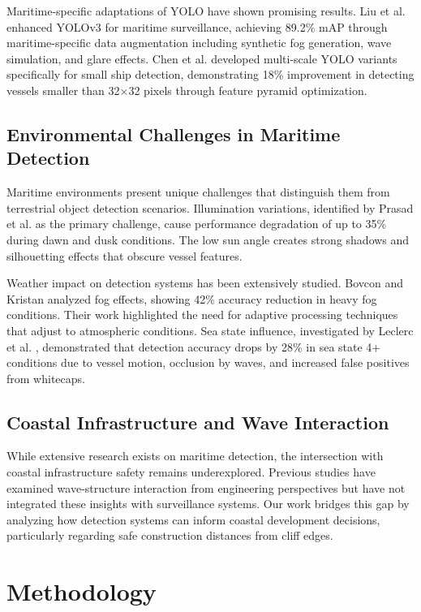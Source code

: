\documentclass[10pt]{article}
\begin{document}
Maritime-specific adaptations of YOLO have shown promising results. Liu et al. \cite{liu2021enhanced} enhanced YOLOv3 for maritime surveillance, achieving 89.2\% mAP through maritime-specific data augmentation including synthetic fog generation, wave simulation, and glare effects. Chen et al. \cite{chen2020improved} developed multi-scale YOLO variants specifically for small ship detection, demonstrating 18\% improvement in detecting vessels smaller than 32×32 pixels through feature pyramid optimization.

\subsection{Environmental Challenges in Maritime Detection}

Maritime environments present unique challenges that distinguish them from terrestrial object detection scenarios. Illumination variations, identified by Prasad et al. \cite{prasad2017video} as the primary challenge, cause performance degradation of up to 35\% during dawn and dusk conditions. The low sun angle creates strong shadows and silhouetting effects that obscure vessel features.

Weather impact on detection systems has been extensively studied. Bovcon and Kristan \cite{bovcon2017segmentation} analyzed fog effects, showing 42\% accuracy reduction in heavy fog conditions. Their work highlighted the need for adaptive processing techniques that adjust to atmospheric conditions. Sea state influence, investigated by Leclerc et al. \cite{leclerc2018impact}, demonstrated that detection accuracy drops by 28\% in sea state 4+ conditions due to vessel motion, occlusion by waves, and increased false positives from whitecaps.

\subsection{Coastal Infrastructure and Wave Interaction}

While extensive research exists on maritime detection, the intersection with coastal infrastructure safety remains underexplored. Previous studies have examined wave-structure interaction from engineering perspectives but have not integrated these insights with surveillance systems. Our work bridges this gap by analyzing how detection systems can inform coastal development decisions, particularly regarding safe construction distances from cliff edges.

\section{Methodology}
\end{document}
